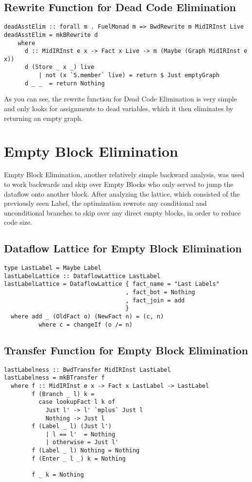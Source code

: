 \documentclass[11pt]{article}
\begin{document}
\subsection{Rewrite Function for Dead Code Elimination}
\begin{verbatim}
deadAsstElim :: forall m . FuelMonad m => BwdRewrite m MidIRInst Live 
deadAsstElim = mkBRewrite d 
    where 
      d :: MidIRInst e x -> Fact x Live -> m (Maybe (Graph MidIRInst e x))
      d (Store _ x _) live 
          | not (x `S.member` live) = return $ Just emptyGraph
      d _ _  = return Nothing
\end{verbatim}

As you can see, the rewrite function for Dead Code Elimination is very simple and only looks for assignments to dead variables, which it then eliminates by returning an empty graph. 

\section {Empty Block Elimination}
\label{sec:blockelim}

Empty Block Elimination, another relatively simple backward analysis, was used to work backwards and skip over Empty Blocks who only served to jump the dataflow onto another block. After analyzing the lattice, which consisted of the previously seen Label, the optimization rewrote any conditional and unconditional branches to skip over any direct empty blocks, in order to reduce code size.

\subsection{Dataflow Lattice for Empty Block Elimination}

\begin{verbatim}
type LastLabel = Maybe Label
lastLabelLattice :: DataflowLattice LastLabel
lastLabelLattice = DataflowLattice { fact_name = "Last Labels"
                                   , fact_bot = Nothing
                                   , fact_join = add
                                   }
  where add _ (OldFact o) (NewFact n) = (c, n)
          where c = changeIf (o /= n)
\end{verbatim}

\subsection{Transfer Function for Empty Block Elimination}
\begin{verbatim}
lastLabelness :: BwdTransfer MidIRInst LastLabel
lastLabelness = mkBTransfer f
  where f :: MidIRInst e x -> Fact x LastLabel -> LastLabel
        f (Branch _ l) k = 
          case lookupFact l k of
            Just l' -> l' `mplus` Just l
            Nothing -> Just l
        f (Label _ l) (Just l')
            | l == l'  = Nothing
            | otherwise = Just l'
        f (Label _ l) Nothing = Nothing
        f (Enter _ l _) k = Nothing
        
        f _ k = Nothing
\end{verbatim}
\end{document}
